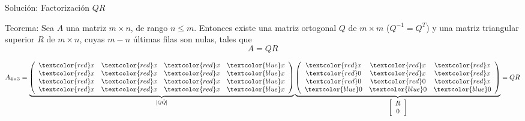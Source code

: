 \documentclass{beamer}
\begin{document}
\begin{frame}{Soluci\'on: Factorizaci\'on $QR$}
  \begin{block}{Teorema:}
    Sea $A$ una matriz $m \times n$, de rango $n \leq m$. Entonces existe una matriz ortogonal $Q$ de $m \times m$ 
  ($Q^{-1} = Q^T$) y una matriz triangular superior $R$ de  $m \times n$, cuyas $m-n$ \'ultimas filas son nulas,  tales 
  que
  $$
  A = QR
  $$
  \end{block}
  $$
  A_{4\times3}=\underbrace{\left(\begin{array}{cccc}
           \textcolor{red}x & \textcolor{red}x  & \textcolor{red}x & \textcolor{blue}x\\
           \textcolor{red}x & \textcolor{red}x  & \textcolor{red}x & \textcolor{blue}x\\
           \textcolor{red}x & \textcolor{red}x  & \textcolor{red}x & \textcolor{blue}x\\
           \textcolor{red}x & \textcolor{red}x  & \textcolor{red}x & \textcolor{blue}x
          \end{array}\right)}_{[Q \tilde Q]}\underbrace{\left(\begin{array}{ccc}
                                                               \textcolor{red}x & \textcolor{red}x & \textcolor{red}x\\
                                                               \textcolor{red}0 & \textcolor{red}x & \textcolor{red}x\\
                                                               \textcolor{red}0 & \textcolor{red}0 & \textcolor{red}x\\
                                                               \textcolor{blue}0 & \textcolor{blue}0 & \textcolor{blue}0\\
                                                              \end{array}\right)}_{\left[\begin{array}{c}
                                                                  R\\
                                                                  0
                                                                 \end{array}\right]}=QR
  $$
  \end{frame}
\end{document}
